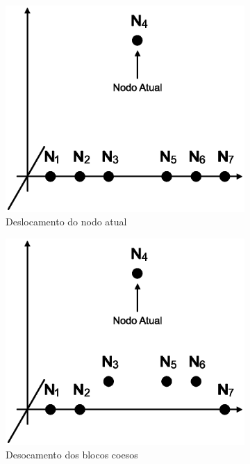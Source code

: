 \begin{figure}
	\begin{subfigure}{.5\textwidth}
  		\centering
  		\includegraphics[width=.9\linewidth]{figuras/nodos1.eps}
  		\caption{Deslocamento do nodo atual}
  		\label{fig:subnodos1}
	\end{subfigure}
	\begin{subfigure}{.5\textwidth}
  		\centering
  		\includegraphics[width=.9\linewidth]{figuras/nodos2.eps}
  		\caption{Desocamento dos blocos coesos}
  		\label{fig:subnodos2}
	\end{subfigure}
	\begin{subfigure}{.5\textwidth}

\end{subfigure}
\end{figure}
